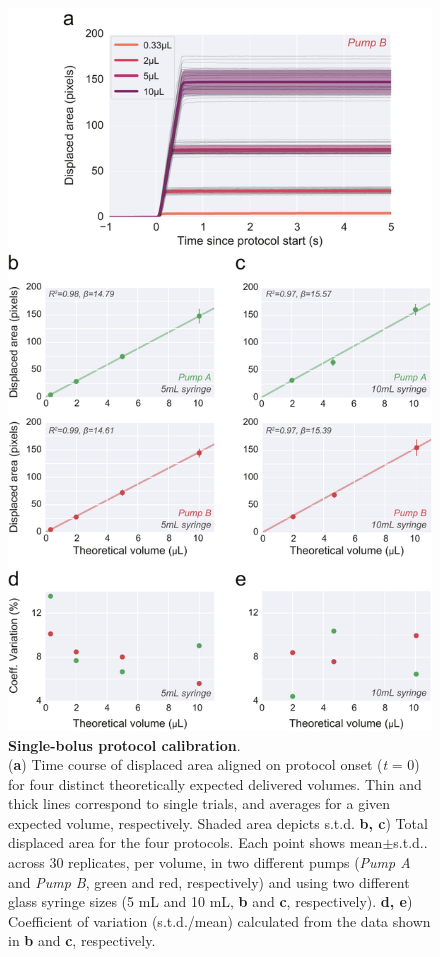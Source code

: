 \begin{figure}
	\centering
	\includegraphics[width=1.0\linewidth]{Figures/Artboard 5.pdf}
	\caption{\textbf{Single-bolus protocol calibration}.\\
		(\textbf{a}) Time course of displaced area aligned on protocol onset (\textit{t} = 0) for four distinct theoretically expected delivered volumes. Thin and thick lines correspond to single trials, and averages for a given expected volume, respectively. Shaded area depicts s.t.d. \textbf{b, c}) Total displaced area for the four protocols. Each point shows mean$\pm$s.t.d.. across 30 replicates, per volume, in two different pumps (\textit{Pump A} and \textit{Pump B}, green and red, respectively) and using two different glass syringe sizes (5 mL and 10 mL, \textbf{b} and \textbf{c}, respectively). \textbf{d, e}) Coefficient of variation (s.t.d./mean) calculated from the data shown in \textbf{b} and \textbf{c}, respectively.}
	\label{fig:SingleStepCalibration} 
\end{figure}

